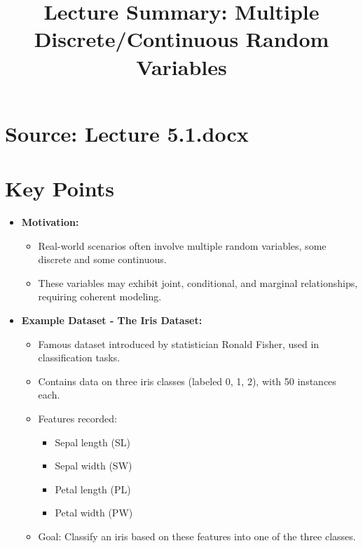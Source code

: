 \documentclass{article}
\title{Lecture Summary: Multiple Discrete/Continuous Random Variables}
\author{}
\date{}
\begin{document}
\maketitle

\section*{Source: Lecture 5.1.docx}

\section*{Key Points}

\begin{itemize}
  \item \textbf{Motivation:}
    \begin{itemize}
      \item Real-world scenarios often involve multiple random variables, some discrete and some continuous.
      \item These variables may exhibit joint, conditional, and marginal relationships, requiring coherent modeling.
    \end{itemize}

  \item \textbf{Example Dataset - The Iris Dataset:}
    \begin{itemize}
      \item Famous dataset introduced by statistician Ronald Fisher, used in classification tasks.
      \item Contains data on three iris classes (labeled 0, 1, 2), with 50 instances each.
      \item Features recorded:
        \begin{itemize}
          \item Sepal length (SL)
          \item Sepal width (SW)
          \item Petal length (PL)
          \item Petal width (PW)
        \end{itemize}
      \item Goal: Classify an iris based on these features into one of the three classes.
    \end{itemize}


\end{itemize}
\end{document}
